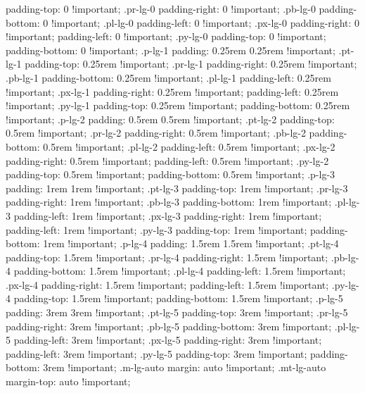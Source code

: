 {{{{{{{{{{{{{{{{{{{{{{{{{{{{{{{{{{{{{{{{{{{{{{{{{{{{{{{{{{{{{{{{{{{{{{{{{{{{{{{{{{{{{{{{{{{{{{{{{{{{{{{{{{{{{{{{{{{{{{{{{{{{{{{{{{{{{{{{{{{{{{{{{{{{{{{{{{{{{{{{{{{{{{{{{{{{{{{{{{{{{{{{{{{{{{{{{{{{{{{{{{{{{{{{{{{{{{{{{{{{{{{{{{{{{{{{{{{{{{{{{{{{{{{{{{{{{{{{{{{{{{{{{{{{{{{{{{{{{{{{{{{{{{{{{{{{{{{{{{{{{{{{{{{{    padding-top: 0 !important; }
  .pr-lg-0 {
    padding-right: 0 !important; }
  .pb-lg-0 {
    padding-bottom: 0 !important; }
  .pl-lg-0 {
    padding-left: 0 !important; }
  .px-lg-0 {
    padding-right: 0 !important;
    padding-left: 0 !important; }
  .py-lg-0 {
    padding-top: 0 !important;
    padding-bottom: 0 !important; }
  .p-lg-1 {
    padding: 0.25rem 0.25rem !important; }
  .pt-lg-1 {
    padding-top: 0.25rem !important; }
  .pr-lg-1 {
    padding-right: 0.25rem !important; }
  .pb-lg-1 {
    padding-bottom: 0.25rem !important; }
  .pl-lg-1 {
    padding-left: 0.25rem !important; }
  .px-lg-1 {
    padding-right: 0.25rem !important;
    padding-left: 0.25rem !important; }
  .py-lg-1 {
    padding-top: 0.25rem !important;
    padding-bottom: 0.25rem !important; }
  .p-lg-2 {
    padding: 0.5rem 0.5rem !important; }
  .pt-lg-2 {
    padding-top: 0.5rem !important; }
  .pr-lg-2 {
    padding-right: 0.5rem !important; }
  .pb-lg-2 {
    padding-bottom: 0.5rem !important; }
  .pl-lg-2 {
    padding-left: 0.5rem !important; }
  .px-lg-2 {
    padding-right: 0.5rem !important;
    padding-left: 0.5rem !important; }
  .py-lg-2 {
    padding-top: 0.5rem !important;
    padding-bottom: 0.5rem !important; }
  .p-lg-3 {
    padding: 1rem 1rem !important; }
  .pt-lg-3 {
    padding-top: 1rem !important; }
  .pr-lg-3 {
    padding-right: 1rem !important; }
  .pb-lg-3 {
    padding-bottom: 1rem !important; }
  .pl-lg-3 {
    padding-left: 1rem !important; }
  .px-lg-3 {
    padding-right: 1rem !important;
    padding-left: 1rem !important; }
  .py-lg-3 {
    padding-top: 1rem !important;
    padding-bottom: 1rem !important; }
  .p-lg-4 {
    padding: 1.5rem 1.5rem !important; }
  .pt-lg-4 {
    padding-top: 1.5rem !important; }
  .pr-lg-4 {
    padding-right: 1.5rem !important; }
  .pb-lg-4 {
    padding-bottom: 1.5rem !important; }
  .pl-lg-4 {
    padding-left: 1.5rem !important; }
  .px-lg-4 {
    padding-right: 1.5rem !important;
    padding-left: 1.5rem !important; }
  .py-lg-4 {
    padding-top: 1.5rem !important;
    padding-bottom: 1.5rem !important; }
  .p-lg-5 {
    padding: 3rem 3rem !important; }
  .pt-lg-5 {
    padding-top: 3rem !important; }
  .pr-lg-5 {
    padding-right: 3rem !important; }
  .pb-lg-5 {
    padding-bottom: 3rem !important; }
  .pl-lg-5 {
    padding-left: 3rem !important; }
  .px-lg-5 {
    padding-right: 3rem !important;
    padding-left: 3rem !important; }
  .py-lg-5 {
    padding-top: 3rem !important;
    padding-bottom: 3rem !important; }
  .m-lg-auto {
    margin: auto !important; }
  .mt-lg-auto {
    margin-top: auto !important; }
}}}}}}}}}}}}}}}}}}}}}}}}}}}}}}}}}}}}}}}}}}}}}}}}}}}}}}}}}}}}}}}}}}}}}}}}}}}}}}}}}}}}}}}}}}}}}}}}}}}}}}}}}}}}}}}}}}}}}}}}}}}}}}}}}}}}}}}}}}}}}}}}}}}}}}}}}}}}}}}}}}}}}}}}}}}}}}}}}}}}}}}}}}}}}}}}}}}}}}}}}}}}}}}}}}}}}}}}}}}}}}}}}}}}}}}}}}}}}}}}}}}}}}}}}}}}}}}}}}}}}}}}}}}}}}}}}}}}}}}}}}}}}}}}}}}}}}}}}}}}}}}}}}}

